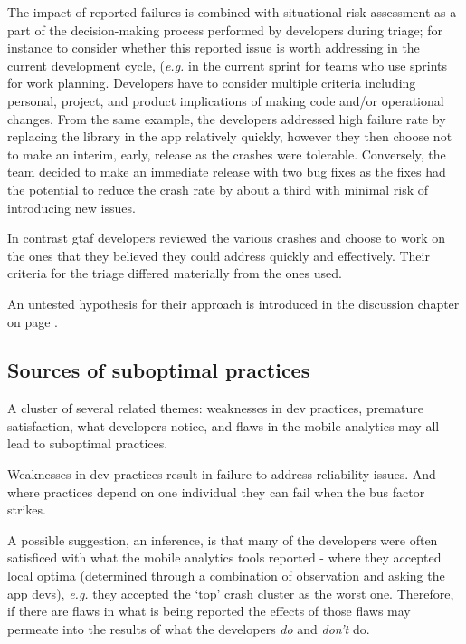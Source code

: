 The impact of reported failures is combined with situational-risk-assessment as a part of the decision-making process performed by developers during triage; for instance to consider whether this reported issue is worth addressing in the current development cycle, (\emph{e.g.} in the current sprint for teams who use sprints for work planning. Developers have to consider multiple criteria including personal, project, and product implications of making code and/or operational changes. From the same  example, the developers addressed high failure rate by replacing the  library in the app relatively quickly, however they then choose not to make an interim, early, release as the crashes were tolerable. Conversely, the  team decided to make an immediate release with two bug fixes as the fixes had the potential to reduce the crash rate by about a third with minimal risk of introducing new issues. 

In contrast \Gls{gtaf} developers reviewed the various crashes and choose to work on the ones that they believed they could address quickly and effectively. Their criteria for the triage differed materially from the ones  used.

An untested hypothesis for their approach is introduced in the discussion chapter on page \pageref{discussion-decision-making-by-dev-teams-section}.

\subsection{Sources of suboptimal practices}
A cluster of several related themes: weaknesses in dev practices, premature satisfaction, what developers notice, and flaws in the mobile analytics may all lead to suboptimal practices.

Weaknesses in dev practices result in failure to address reliability issues. And where practices depend on one individual they can fail when the bus factor strikes. 

A possible suggestion, an inference, is that many of the developers were often satisficed with what the mobile analytics tools reported - where they accepted local optima (determined through a combination of observation and asking the app devs), \textit{e.g.} they accepted the `top' crash cluster as the worst one. Therefore, if there are flaws in what is being reported the effects of those flaws may permeate into the results of what the developers \textit{do} and \textit{don't} do.

